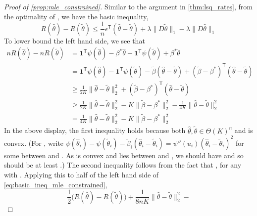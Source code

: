\documentclass[ejs,noshowframe]{imsart}
\theoremstyle{plain}
\theoremstyle{definition}
\newcommand{\R}{\mathbb{R}}
\newcommand{\one}{\mathbf{1}}
\renewcommand{\hat}{\widehat}
\renewcommand{\top}{\mathsf{T}}
\renewcommand{\tilde}{\widetilde}
\begin{document}
\begin{appendix}
\begin{proof}[Proof of \autoref{prop:mle_constrained}]
	Similar to the argument in \autoref{thm:lsq_rates}, from the optimality of 
	\smash{$\hat\theta$}, we have the basic inequality,
	\begin{equation}
		\label{eq:basic_ineq_mle_constrained}
		R(\hat\theta) - R(\tilde\theta) \leq \frac{1}{n} \epsilon^\top (\hat\theta 
		- 
		\tilde\theta) + \lambda \|D\tilde\theta\|_1 - \lambda \|D\hat\theta\|_1
	\end{equation}
	To lower bound the left hand side, we see that
	\begin{align*}
		n R(\hat\theta) - n R(\tilde\theta) 
		&= \one^\top \psi(\hat\theta) - \beta^*\hat\theta - \one^\top 
		\psi(\tilde\theta) + \beta^* \tilde \theta\\
		&= \one^\top  \psi(\hat\theta) - \one^\top \psi(\tilde\theta) - \tilde 
		\beta 
		(\hat\theta - \tilde\theta) + (\tilde\beta -\beta^*)^\top (\hat\theta - 
		\tilde\theta) \\
		&\geq \frac{1}{2K} \| \hat \theta - \tilde \theta \|_2^2 + (\tilde\beta 
		- \beta^*)^\top (\hat\theta - \tilde\theta)\\
		&\geq \frac{1}{2K} \| \hat \theta - \tilde \theta \|_2^2 - K 
		\|\tilde\beta - \beta^*\|_2^2 - \frac{1}{4K}\| \hat\theta - 
		\tilde\theta\|_2^2\\
		&= \frac{1}{4K} \| \hat \theta - \tilde \theta \|_2^2 - K \|\tilde\beta 
		- \beta^*\|_2^2 
	\end{align*} 
	In the above display, the first inequality holds because both 
	$\hat\theta, 
		\tilde \theta \in \Theta(K)^n$ and  is convex. 
	(For , write 
	$\psi(\hat\theta_i) - \psi(\tilde\theta_i) - \tilde \beta_i 
		(\hat\theta_i - 
		\tilde\theta_i) 
		= \psi''(u_i) (\hat\theta_i - \tilde\theta_i)^2$
	for some  between 
	\smash{$\hat\theta_i$} and 
	\smash{$\tilde\theta_i$}. As  is convex and  
	lies 
	between \smash{$\hat\theta_i$} and \smash{$\tilde\theta_i$}, we should have 
	and so  should be at least .)
	The second inequality follows from the fact that 
	, for any 
	\smash{$a,b,c\in \R$} with . Applying this to half of 
	the 
	left hand side of  \eqref{eq:basic_ineq_mle_constrained},
	\begin{equation}
		\frac{1}{2} \big( R(\hat\theta) - R(\tilde\theta) \big) +  \frac{1}{8nK} \| 
		\hat \theta - \tilde \theta \|_2^2 - 

\end{equation}
\end{proof}
\end{appendix}
\end{document}
